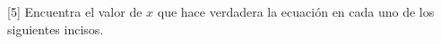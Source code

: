 [5] Encuentra el valor de $x$ que hace verdadera la ecuaci\'on en cada uno de los siguientes incisos.
\begin{multicols}{2}
    \begin{parts}
        {\printanswers
            
        }
        
        
        
        
        
        
        
        
        
        
    \end{parts}
\end{multicols}